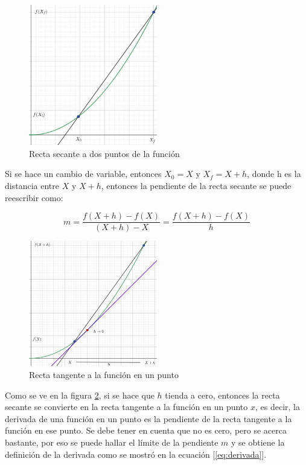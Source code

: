 \begin{figure}[H]
    \centering
    \includegraphics[width=0.5\textwidth]{images/geogebra/derivadaDef1.jpeg}
    \caption{Recta secante a dos puntos de la función}
    \label{fig:secante}
\end{figure}

Si se hace un cambio de variable, entonces $X_0 = X$ y $X_f = X + h$, donde h es la distancia entre $X$ y $X + h$, entonces la pendiente de la recta secante se puede reescribir como:

\begin{equation}
        m = \frac{f(X + h) - f(X)}{(X + h) - X} = \frac{f(X + h) - f(X)}{h}
        \label{eq:pendiente_secante_h}
\end{equation}

\begin{figure}[H]
    \centering
    \includegraphics[width=0.5\textwidth]{images/geogebra/derivadaDef2.jpeg}
    \caption{Recta tangente a la función en un punto}
    \label{fig:def_derivada}
\end{figure}

Como se ve en la figura \ref{fig:def_derivada}, si se hace que $h$ tienda a cero, entonces la recta secante se convierte en la recta tangente a la función en un punto $x$, es decir, la derivada de una función en un punto es la pendiente de la recta tangente a la función en ese punto.
Se debe tener en cuenta que no es cero, pero se acerca bastante, por eso se puede hallar el límite de la pendiente $m$ y se obtiene la definición de la derivada como se mostró en la ecuación [\ref{eq:derivada}].